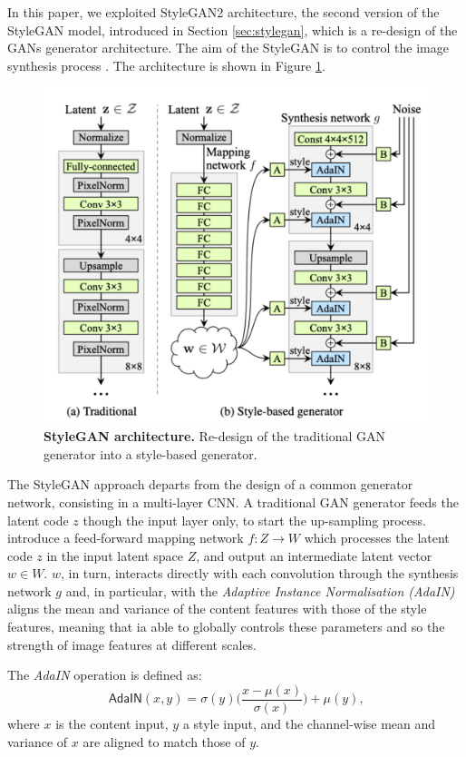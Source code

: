 \documentclass{article}
\begin{document}
	In this paper, we exploited StyleGAN2 architecture, the second version of the StyleGAN model, 
	introduced in Section \ref{sec:stylegan}, which is a re-design of the GANs generator architecture.
	The aim of the StyleGAN is to control the image synthesis process \cite{karras2019style}. The 
	architecture is shown in Figure \ref{fig:styleGAN}.
	\begin{figure}[htb]				
		\centering
		\includegraphics[width=.55\linewidth]{images/styleGAN}
		\caption{\textbf{StyleGAN architecture.} Re-design of the traditional GAN generator into a 
			style-based generator.}
		\label{fig:styleGAN}
	\end{figure}
	
	The StyleGAN approach departs from the design of a common generator network, consisting in a 
	multi-layer CNN.
	A traditional GAN generator feeds the latent code $z$ though the input layer only, to start the 
	up-sampling process.
	\citet{karras2019style} introduce a feed-forward mapping network $f : Z \rightarrow W$ which 
	processes the latent code $z$ in the input latent space $Z$, and output an intermediate latent 
	vector $w \in W$. 
	$w$, in turn, interacts directly with each convolution through the synthesis network  $g$ and, in 
	particular, with the \textit{Adaptive Instance Normalisation (AdaIN)} \cite{huang2017arbitrary} aligns 
	the mean and variance of the content features with those of the style features, meaning that ia able 
	to globally controls these parameters and so the strength of image features at different scales. 
	
	The \textit{AdaIN} operation is defined as:
	\begin{equation}
		\label{e:adain}
		\mathsf{AdaIN}(x, y) = \sigma(y) \bigg(\frac{x - \mu(x)}{\sigma (x)} \bigg) + \mu (y) \mbox{,}
	\end{equation}
	where $x$ is the content input, $y$ a style input, and the channel-wise mean and variance of $x$ 
	are aligned to match those of $y$.
	
\end{document}
